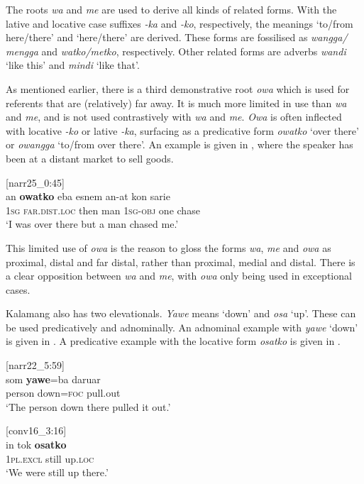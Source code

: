 \documentclass[output=paper,colorlinks,citecolor=brown]{langscibook}
\begin{document}
The roots \textit{wa} and \textit{me} are used to derive all kinds of related forms. With the lative and locative case suffixes \textit{-ka} and \textit{-ko}, respectively, the meanings `to/from here/there' and `here/there' are derived. These forms are fossilised as \textit{wangga/ mengga} and \textit{watko/metko}, respectively. Other related forms are adverbs \textit{wandi} `like this' and \textit{mindi} `like that'.

As mentioned earlier, there is a third demonstrative root \textit{owa} which is used for referents that are (relatively) far away. It is much more limited in use than \textit{wa} and \textit{me}, and is not used contrastively with \textit{wa} and \textit{me}. \textit{Owa} is often inflected with locative \textit{-ko} or lative \textit{-ka}, surfacing as a predicative form \textit{owatko} `over there' or \textit{owangga} `to/from over there'. An example is given in , where the speaker has been at a distant market to sell goods.

	\ea\label{exe:owatko} [narr25\_0:45]\\	
	\gll an \textbf{owatko} eba esnem an-at kon sarie\\
	\textsc{1sg} \textsc{far.dist.loc} then man \textsc{1sg-obj} one chase\\	
	\glt	`I was over there but a man chased me.' 
	\z 

This limited use of \textit{owa} is the reason to gloss the forms \textit{wa}, \textit{me} and \textit{owa} as proximal, distal and far distal, rather than proximal, medial and distal. There is a clear opposition between \textit{wa} and \textit{me}, with \textit{owa} only being used in exceptional cases.

Kalamang also has two elevationals. \textit{Yawe} means `down' and \textit{osa} `up'. These can be used predicatively and adnominally. An adnominal example with \textit{yawe} `down' is given in . A predicative example with the locative form \textit{osatko} is given in .

\ea \label{exe:yaweba} [narr22\_5:59]\\
\gll som \textbf{yawe}=ba daruar\\
person down=\textsc{foc} pull.out\\
\glt `The person down there pulled it out.' 
\z 

\ea \label{exe:osatko} [conv16\_3:16]\\
\gll in tok \textbf{osatko}\\
\textsc{1pl.excl} still up.\textsc{loc}\\
\glt `We were still up there.' 
\z 
\end{document}
